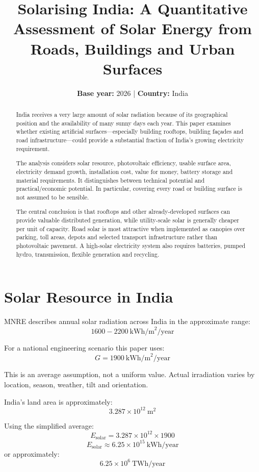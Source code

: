 \documentclass[11pt,a4paper]{article}
\title{\textbf{Solarising India: A Quantitative Assessment of Solar Energy from Roads, Buildings and Urban Surfaces}}
\author{\textbf{Base year:} 2026 \quad | \quad \textbf{Country:} India}
\date{}
\begin{document}
\maketitle

\begin{abstract}
India receives a very large amount of solar radiation because of its geographical position and the availability of many sunny days each year. This paper examines whether existing artificial surfaces---especially building rooftops, building façades and road infrastructure---could provide a substantial fraction of India's growing electricity requirement.

The analysis considers solar resource, photovoltaic efficiency, usable surface area, electricity demand growth, installation cost, value for money, battery storage and material requirements. It distinguishes between technical potential and practical/economic potential. In particular, covering every road or building surface is not assumed to be sensible.

The central conclusion is that rooftops and other already-developed surfaces can provide valuable distributed generation, while utility-scale solar is generally cheaper per unit of capacity. Road solar is most attractive when implemented as canopies over parking, toll areas, depots and selected transport infrastructure rather than photovoltaic pavement. A high-solar electricity system also requires batteries, pumped hydro, transmission, flexible generation and recycling.
\end{abstract}

\hr

\section{Solar Resource in India}

MNRE describes annual solar radiation across India in the approximate range:
\[
1600-2200\ \text{kWh/m}^2/\text{year}
\]

For a national engineering scenario this paper uses:
\[
G = 1900\ \text{kWh/m}^2/\text{year}
\]

This is an average assumption, not a uniform value. Actual irradiation varies by location, season, weather, tilt and orientation.

India's land area is approximately:
\[
3.287 \times 10^{12}\ \text{m}^2
\]

Using the simplified average:
\[
E_{\text{solar}} = 3.287 \times 10^{12} \times 1900
\]
\[
\boxed{E_{\text{solar}} \approx 6.25 \times 10^{15}\ \text{kWh/year}}
\]
or approximately:
\[
\boxed{6.25 \times 10^6\ \text{TWh/year}}
\]
\end{document}
